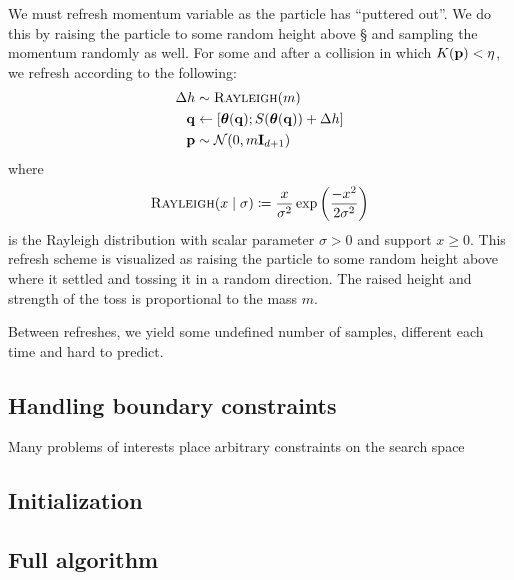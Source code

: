 We must refresh momentum variable as the particle has ``puttered out''. We do
this by raising the particle to some random height above \S{} and sampling the
momentum randomly as well. For some \q{} and \p{} after a collision in which
$K(\mathbf{p}{}) < \eta$, we refresh according to the following:
\begin{align*}
    \Delta h &\sim \textsc{Rayleigh}(m) \\
    \mathbf{q}{} &\gets [\boldsymbol{\theta}(\mathbf{q}); S(\boldsymbol{\theta}(\mathbf{q})) + \Delta h] \\
    \mathbf{p}{} &\sim \mathcal{N}(0, m\mathbf{I}_{d+1})
\end{align*}
where
\begin{equation*}
    \textsc{Rayleigh}(x \mid \sigma) \coloneqq \frac{x}{\sigma^2}\exp\left(\frac{-x^2}{2\sigma^2}\right)
\end{equation*}
is the Rayleigh distribution with scalar parameter $\sigma > 0$ and support $x
\geq 0$. This refresh scheme is visualized as raising the particle to some
random height above where it settled and tossing it in a random direction. The
raised height and strength of the toss is proportional to the mass $m$.

Between refreshes, we yield some undefined number of samples, different each
time and hard to predict.

\subsection{Handling boundary constraints} \label{ss:constraints}

Many problems of interests place arbitrary constraints on the search space

\subsection{Initialization} \label{ss:initialization}

\subsection{Full algorithm} \label{ss:algo}
